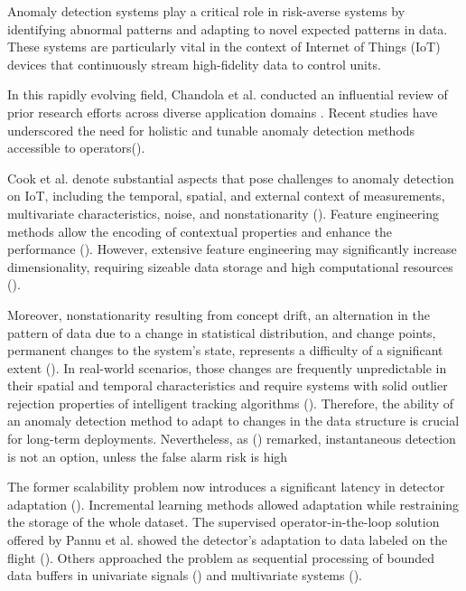 Anomaly detection systems play a critical role in risk-averse systems by identifying abnormal patterns and adapting to novel expected patterns in data. These systems are particularly vital in the context of Internet of Things (IoT) devices that continuously stream high-fidelity data to control units.

In this rapidly evolving field, Chandola et al. conducted an influential review of prior research efforts across diverse application domains \cite{Chandola2009}.
Recent studies have underscored the need for holistic and tunable anomaly detection methods accessible to operators(\cite{Laptev2015, Kejariwal2015, Cook2020}).

Cook et al. denote substantial aspects that pose challenges to anomaly detection on IoT, including the temporal, spatial, and external context of measurements, multivariate characteristics, noise, and nonstationarity (\cite{Cook2020}). Feature engineering methods allow the encoding of contextual properties and enhance the performance (\cite{Fan2019}). However, extensive feature engineering may significantly increase dimensionality, requiring sizeable data storage and high computational resources (\cite{Talagala2021}).

Moreover, nonstationarity resulting from concept drift, an alternation in the pattern of data due to a change in statistical distribution, and change points, permanent changes to the system's state, represents a difficulty of a significant extent (\cite{Salehi2018}). In real-world scenarios, those changes are frequently unpredictable in their spatial and temporal characteristics and require systems with solid outlier rejection properties of intelligent tracking algorithms (\cite{Barbosa2019162}). Therefore, the ability of an anomaly detection method to adapt to changes in the data structure is crucial for long-term deployments. Nevertheless, as (\cite{Tartakovsky2013}) remarked, instantaneous detection is not an option, unless the false alarm risk is high

The former scalability problem now introduces a significant latency in detector adaptation (\cite{Wu2021}). Incremental learning methods allowed adaptation while restraining the storage of the whole dataset. The supervised operator-in-the-loop solution offered by Pannu et al. showed the detector's adaptation to data labeled on the flight (\cite{Pannu2012}).
Others approached the problem as sequential processing of bounded data buffers in univariate signals (\cite{Ahmad2017134}) and multivariate systems (\cite{Bosman201514}).

